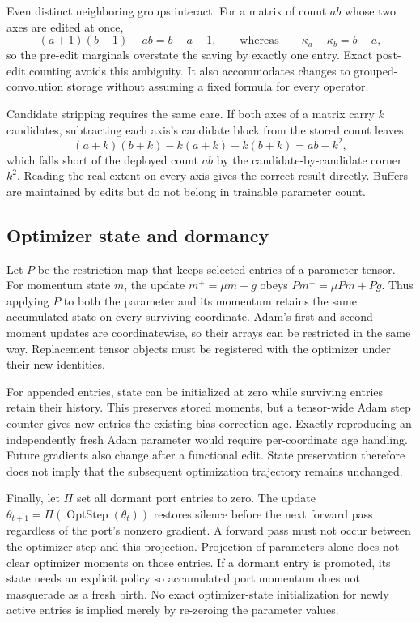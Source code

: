 \documentclass[10pt]{article}
\theoremstyle{paper}
\begin{document}
Even distinct neighboring groups interact. For a matrix of count $ab$ whose two axes are edited at once,
\begin{equation}
(a+1)(b-1)-ab=b-a-1,
\qquad\text{whereas}\qquad
\kappa_a-\kappa_b=b-a,
\label{eq:neighbourcross}
\end{equation}
so the pre-edit marginals overstate the saving by exactly one entry. Exact post-edit counting avoids this ambiguity. It also accommodates changes to grouped-convolution storage without assuming a fixed formula for every operator.

Candidate stripping requires the same care. If both axes of a matrix carry $k$ candidates, subtracting each axis's candidate block from the stored count leaves
\begin{equation}
(a+k)(b+k)-k(a+k)-k(b+k)=ab-k^2,
\label{eq:stripcorner}
\end{equation}
which falls short of the deployed count $ab$ by the candidate-by-candidate corner $k^2$. Reading the real extent on every axis gives the correct result directly. Buffers are maintained by edits but do not belong in trainable parameter count.

\subsection{Optimizer state and dormancy}
\label{app:coupling-optimizer}
Let $P$ be the restriction map that keeps selected entries of a parameter tensor. For momentum state $m$, the update $m^+=\mu m+g$ obeys $Pm^+=\mu Pm+Pg$. Thus applying $P$ to both the parameter and its momentum retains the same accumulated state on every surviving coordinate. Adam's first and second moment updates are coordinatewise, so their arrays can be restricted in the same way. Replacement tensor objects must be registered with the optimizer under their new identities.

For appended entries, state can be initialized at zero while surviving entries retain their history. This preserves stored moments, but a tensor-wide Adam step counter gives new entries the existing bias-correction age. Exactly reproducing an independently fresh Adam parameter would require per-coordinate age handling. Future gradients also change after a functional edit. State preservation therefore does not imply that the subsequent optimization trajectory remains unchanged.

Finally, let $\Pi$ set all dormant port entries to zero. The update $\theta_{t+1}=\Pi(\operatorname{OptStep}(\theta_t))$ restores silence before the next forward pass regardless of the port's nonzero gradient. A forward pass must not occur between the optimizer step and this projection. Projection of parameters alone does not clear optimizer moments on those entries. If a dormant entry is promoted, its state needs an explicit policy so accumulated port momentum does not masquerade as a fresh birth. No exact optimizer-state initialization for newly active entries is implied merely by re-zeroing the parameter values.
\end{document}
